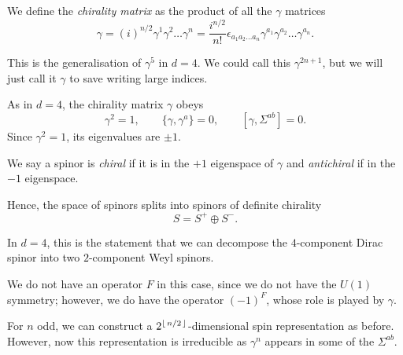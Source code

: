\begin{definition}
  We define the \emph{chirality matrix} as the product of all the $\gamma$  matrices
  \begin{equation}
    \label{eq:chirality}
    \gamma = (i)^{n / 2} \gamma^1 \gamma^2 \dots \gamma^{n} = \frac{i^{n / 2}}{n!} \epsilon_{a_1 a_2 \dots a_n} \gamma^{a_1} \gamma^{a_2} \dots \gamma^{a_n}.
  \end{equation}
\end{definition}
\begin{remark}
  This is the generalisation of $\gamma^5$ in $d = 4$. We could call this $\gamma^{2n+1}$, but we will just call it $\gamma$ to save writing large indices.
\end{remark}
As in $d = 4$, the chirality matrix $\gamma$ obeys
 \begin{equation}
  \gamma^2 = 1, \qquad \{\gamma, \gamma^{a}\} = 0, \qquad [\gamma, \Sigma^{ab}] = 0.
\end{equation}
Since $\gamma^2 = 1$, its eigenvalues are  $\pm 1$.
\begin{definition}[chirality]
  We say a spinor is \emph{chiral} if it is in the $+1$ eigenspace of $\gamma$ and \emph{antichiral} if in the $-1$ eigenspace.
\end{definition}
Hence, the space of spinors splits into spinors of definite chirality
\begin{equation}
  S = S^+ \oplus S^-.
\end{equation}
\begin{remark}
  In $d = 4$, this is the statement that we can decompose the $4$-component Dirac spinor into two $2$-component Weyl spinors.
\end{remark}
We do not have an operator $F$ in this case, since we do not have the $U(1)$ symmetry; however, we do have the operator $(-1)^F$, whose role is played by $\gamma$.
\begin{remark}
  For $n$ odd, we can construct a $2^{\floor{\flatfrac{n}{2}}}$-dimensional spin representation as before.
  However, now this representation is irreducible as $\gamma^n$ appears in some of the $\Sigma^{ab}$.
\end{remark}

